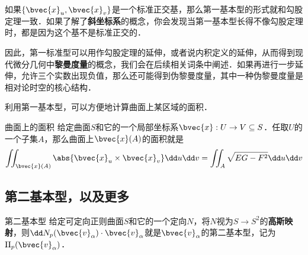 如果$\{\bvec{x}_u, \bvec{x}_v\}$是一个标准正交基，那么第一基本型的形式就和勾股定理一致．如果了解了\textbf{斜坐标系}的概念，你会发现当第一基本型长得不像勾股定理时，都是因为这个基不是标准正交的．

因此，第一标准型可以用作勾股定理的延伸，或者说内积定义的延伸，从而得到现代微分几何中\textbf{黎曼度量}的概念，我们会在后续相关词条中阐述．如果再进行一步延伸，允许三个实数出现负值，那么还可能得到伪黎曼度量，其中一种伪黎曼度量是相对论时空的核心结构．

利用第一基本型，可以方便地计算曲面上某区域的面积．

\begin{theorem}{曲面上的面积}
给定曲面$S$和它的一个局部坐标系$\bvec{x}:U\to V\subseteq S$．任取$U$的一个子集$A$，那么曲面上$\bvec{x}(A)$的面积就是
\begin{equation}
\iint_{\bvec{x}(A)}\abs{\bvec{x}_u\times\bvec{x}_v}\dd u\dd v=\iint_{A}\sqrt{EG-F^2} \dd u\dd v
\end{equation}
\end{theorem}


\subsection{第二基本型，以及更多}

\begin{definition}{第二基本型}
给定可定向正则曲面$S$和它的一个定向$N$，将$N$视为$S\to S^2$的\textbf{高斯映射}，则$\dd N_p(\bvec{v}_\alpha)\cdot \bvec{v}_\alpha$就是$\bvec{v}_\alpha$的第二基本型，记为$\mathrm{II}_p(\bvec{v}_\alpha)$．
\end{definition}

